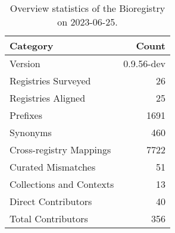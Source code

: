 \begin{table}
\caption{Overview statistics of the Bioregistry on 2023-06-25.}
\label{tab:bioregistry-summary}
\begin{tabular}{lr}
\toprule
Category & Count \\
\midrule
Version & 0.9.56-dev \\
Registries Surveyed & 26 \\
Registries Aligned & 25 \\
Prefixes & 1691 \\
Synonyms & 460 \\
Cross-registry Mappings & 7722 \\
Curated Mismatches & 51 \\
Collections and Contexts & 13 \\
Direct Contributors & 40 \\
Total Contributors & 356 \\
\bottomrule
\end{tabular}
\end{table}
